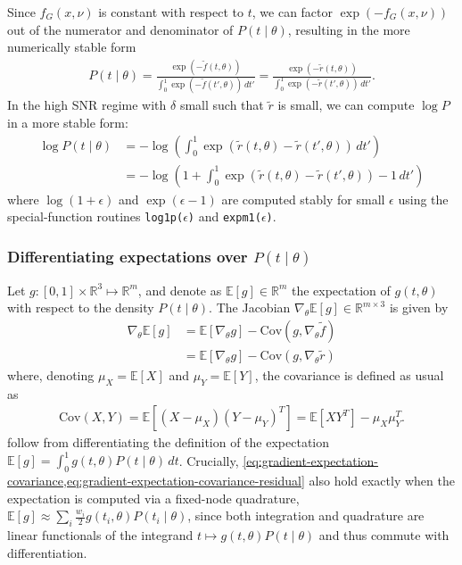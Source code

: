 \documentclass{article}
\begin{document}
Since $f_G(x,\nu)$ is constant with respect to $t$, we can factor $\exp(-f_G(x,\nu))$ out of the numerator and denominator of $P(t \mid \theta)$, resulting in the more numerically stable form
%
\begin{align}
  P(t \mid \theta)
  = \frac{\exp(-\tilde{f}(t, \theta))}{\int_0^1 \exp(-\tilde{f}(t', \theta)) \, dt'}
  = \frac{\exp(-\tilde{r}(t, \theta))}{\int_0^1 \exp(-\tilde{r}(t', \theta)) \, dt'}.
\end{align}
%
In the high SNR regime with $\delta$ small such that $\tilde{r}$ is small, we can compute $\log P$ in a more stable form:
%
\begin{align}
  \log P(t \mid \theta)
   & = -\log \left( \int_0^1 \exp(\tilde{r}(t, \theta) - \tilde{r}(t', \theta)) \, dt' \right)        \\
   & = -\log \left(1 + \int_0^1 \exp(\tilde{r}(t, \theta) - \tilde{r}(t', \theta)) - 1 \, dt' \right)
\end{align}
%
where $\log(1 + \epsilon)$ and $\exp(\epsilon - 1)$ are computed stably for small $\epsilon$ using the special-function routines \texttt{log1p($\epsilon$)} and \texttt{expm1($\epsilon$)}.

\subsubsection{Differentiating expectations over $P(t \mid \theta)$}\label{sec:jacobian-expectation-covariance}

Let $g : [0, 1] \times \mathbb{R}^3 \mapsto \mathbb{R}^m$, and denote as $\mathbb{E}[g] \in \mathbb{R}^m$ the expectation of $g(t, \theta)$ with respect to the density $P(t \mid \theta)$.
The Jacobian $\nabla_\theta \mathbb{E}[g] \in \mathbb{R}^{m \times 3}$ is given by
%
\begin{align}
  \nabla_\theta \mathbb{E}[g] & = \mathbb{E}[\nabla_\theta g] - \mathrm{Cov}(g, \nabla_\theta \tilde{f}) \label{eq:gradient-expectation-covariance}          \\
                              & = \mathbb{E}[\nabla_\theta g] - \mathrm{Cov}(g, \nabla_\theta \tilde{r}) \label{eq:gradient-expectation-covariance-residual}
\end{align}
%
where, denoting $\mu_X = \mathbb{E}[X]$ and $\mu_Y = \mathbb{E}[Y]$, the covariance is defined as usual as
%
\begin{align}
  \mathrm{Cov}(X, Y) = \mathbb{E}[(X - \mu_X)(Y - \mu_Y)^T] = \mathbb{E}[X Y^T] - \mu_X \mu_Y^T.
\end{align}
%
 follow from differentiating the definition of the expectation $\mathbb{E}[g] = \int_0^1 g(t, \theta) P(t \mid \theta) \, dt$.
Crucially, \cref{eq:gradient-expectation-covariance,eq:gradient-expectation-covariance-residual} also hold exactly when the expectation is computed via a fixed-node quadrature, $\mathbb{E}[g] \approx \sum_i \frac{w_i}{2} g(t_i, \theta) P(t_i \mid \theta)$, since both integration and quadrature are linear functionals of the integrand $t \mapsto g(t,\theta) P(t \mid \theta)$ and thus commute with differentiation.
\end{document}
